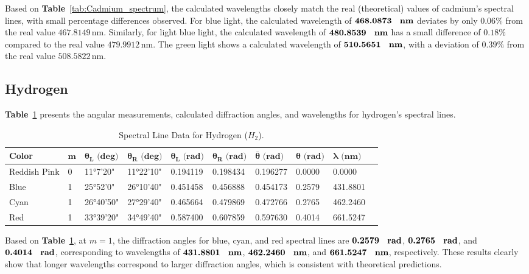 \documentclass[a4paper,11pt]{article}
\begin{document}
\quad Based on \textbf{Table}~\ref{tab:Cadmium_spectrum}, the calculated wavelengths closely match the real (theoretical) values of cadmium’s spectral lines, with small percentage differences observed. For blue light, the calculated wavelength of \(\textbf{468.0873 \, \text{nm}}\) deviates by only \(0.06\%\) from the real value \(467.8149 \, \text{nm}\). Similarly, for light blue light, the calculated wavelength of \(\textbf{480.8539 \, \text{nm}}\) has a small difference of \(0.18\%\) compared to the real value \(479.9912 \, \text{nm}\). The green light shows a calculated wavelength of \(\textbf{510.5651 \, \text{nm}}\), with a deviation of \(0.39\%\) from the real value \(508.5822 \, \text{nm}\).

\newpage
\subsection*{Hydrogen}
\label{sec:hydrogen}

\textbf{Table}~\ref{tab:spectral_data_h2} presents the angular measurements, calculated diffraction angles, and wavelengths for hydrogen's spectral lines.
\begin{table}[H]
  \centering
  \begin{tabular}{llllllllll}
  \toprule
  \textbf{Color} & \(\boldsymbol{m}\) & \(\boldsymbol{\theta_L \text{ (deg)}}\) & \(\boldsymbol{\theta_R \text{ (deg)}}\) & \(\boldsymbol{\theta_L \text{ (rad)}}\) & \(\boldsymbol{\theta_R \text{ (rad)}}\) & \(\boldsymbol{\bar \theta \text{ (rad)}}\) & \(\boldsymbol{\theta \text{ (rad)}}\) & \(\boldsymbol{\lambda \text{ (nm)}}\) \\
  \midrule
  Reddish Pink & 0 & 11°7'20"  & 11°22'10"  & 0.194119 & 0.198434 & 0.196277 & 0.0000 & 0.0000 \\
  Blue    & 1 & 25°52'0"  & 26°10'40"  & 0.451458 & 0.456888 & 0.454173 & 0.2579 & 431.8801 \\
  Cyan   & 1 & 26°40'50" & 27°29'40"  & 0.465664 & 0.479869 & 0.472766 & 0.2765 & 462.2460 \\
  Red          & 1 & 33°39'20" & 34°49'40"  & 0.587400 & 0.607859 & 0.597630 & 0.4014 & 661.5247 \\
  \bottomrule
  \end{tabular}
  \caption{Spectral Line Data for Hydrogen (\(H_2\)).}
  \label{tab:spectral_data_h2}
\end{table}

\quad Based on \textbf{Table}~\ref{tab:spectral_data_h2}, at \(m = 1\), the diffraction angles for blue, cyan, and red spectral lines are \(\textbf{0.2579 \, \text{rad}}\), \(\textbf{0.2765 \, \text{rad}}\), and \(\textbf{0.4014 \, \text{rad}}\), corresponding to wavelengths of \(\textbf{431.8801 \, \text{nm}}\), \(\textbf{462.2460 \, \text{nm}}\), and \(\textbf{661.5247 \, \text{nm}}\), respectively. These results clearly show that longer wavelengths correspond to larger diffraction angles, which is consistent with theoretical predictions.\\
\end{document}
